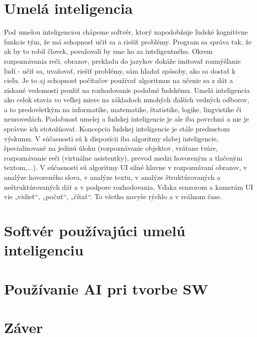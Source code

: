 \documentclass[10pt,twoside,slovak,a4paper]{article}
\begin{document}
\section{Umelá inteligencia}\label{AI}

Pod umelou inteligenciou chápeme softvér, ktorý napodobňuje ľudské kognitívne funkcie tým, že má schopnosť učiť sa a riešiť problémy. Program sa správa tak, že ak by to robil človek, považovali by sme ho za inteligentného. Okrem rozpoznávania reči, obrazov, prekladu do jazykov dokáže imitovať rozmýšľanie ľudí - učiť sa, uvažovať, riešiť problémy, sám hľadať spôsoby, ako sa dostať k cieľu. Je to aj schopnosť počítačov používať algoritmus na učenie sa z dát a získané vedomosti použiť na rozhodovanie podobné ľudskému. Umelá inteligencia ako celok stavia vo veľkej miere na základoch mnohých ďalších vedných odborov, a to predovšetkým na informatike, matematike, štatistike, logike, lingvistike či neurovedách. Podobnosť umelej a ľudskej inteligencie je ale iba povrchná a nie je správne ich stotožňovať. Koncepcia ľudskej inteligencie je stále predmetom výskumu.
V súčasnosti sú k dispozícii iba algoritmy slabej inteligencie, špecializované na jedinú úlohu
(rozpoznávanie objektov, vrátane tváre, rozpoznávanie reči (virtuálne asistentky), prevod
medzi hovoreným a tlačeným textom,...). V súčasnosti sú algoritmy UI silné hlavne v rozpoznávaní obrazov, v analýze hovoreného slova, v analýze textu, v analýze štruktúrovaných a neštruktúrovaných dát a v podpore rozhodovania. Vďaka senzorom a kamerám UI vie „vidieť“, „počuť“, „čítať“. To všetko navyše rýchlo a v reálnom čase.\cite{AIvMed}


\section{Softvér používajúci umelú inteligenciu} \label{AISW}


\section{Používanie AI pri tvorbe SW} \label{pouzitie AI pri SW}

\section{Záver} \label{zaver} %



 
\end{document}
